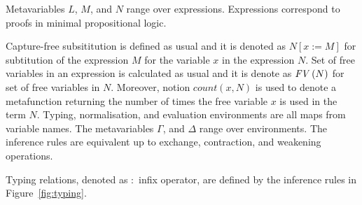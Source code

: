 \documentclass[11p,a4paper]{article}
\newcommand{\sbs}[3]{#1[#2:=#3]}
\newcommand{\fv}[1]{\txt{FV}\,(#1)}
\newcommand{\txt}[1]{\text{\emph{#1}}}
\begin{document}
Metavariables $L$, $M$, and $N$ range over expressions. Expressions
correspond to proofs in minimal propositional logic.


Capture-free subsititution is defined as usual and it is denoted
as $\sbs{N}{x}{M}$ for subtitution of the expression $M$ for the
variable $x$ in the expression $N$. Set of free variables in an
expression is calculated as usual and it is denote as $\fv{N}$ for set
of free variables in $N$. Moreover, notion $count(x,N)$ is used to
denote a metafunction returning the number of times the free variable
$x$ is used in the term $N$.
Typing, normalisation, and evaluation environments are all maps from
variable names. The metavariables $\Gamma$, and $\Delta$ range over
environments.  The inference rules are equivalent up to exchange,
contraction, and weakening operations.

Typing relations, denoted as $:$ infix operator, are defined by
the inference rules in Figure~\ref{fig:typing}.
\end{document}
